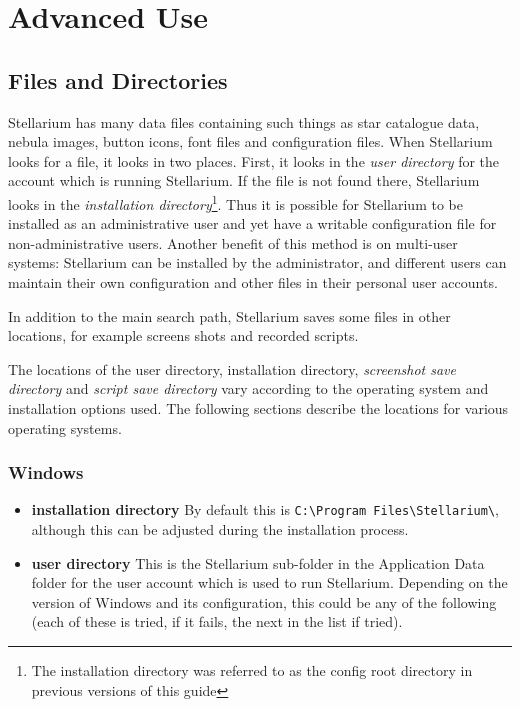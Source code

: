 
\chapter{Advanced Use}\label{advanced-use}

\section{Files and Directories}\label{files-and-directories}

Stellarium has many data files containing such things as star catalogue
data, nebula images, button icons, font files and configuration files.
When Stellarium looks for a file, it looks in two places. First, it
looks in the \emph{user directory} for the account which is running
Stellarium. If the file is not found there, Stellarium looks in the
\emph{installation directory}\footnote{The installation directory was
  referred to as the config root directory in previous versions of this
  guide}. Thus it is possible for Stellarium to be installed as an
administrative user and yet have a writable configuration file for
non-administrative users. Another benefit of this method is on
multi-user systems: Stellarium can be installed by the administrator,
and different users can maintain their own configuration and other files
in their personal user accounts.

In addition to the main search path, Stellarium saves some files in
other locations, for example screens shots and recorded scripts.

The locations of the user directory, installation directory,
\emph{screenshot save directory} and \emph{script save directory} vary
according to the operating system and installation options used. The
following sections describe the locations for various operating systems.

\subsection{Windows}\label{windows}

\begin{itemize}
\item
  \textbf{installation directory} By default this is
  \texttt{C:\textbackslash{}Program\ Files\textbackslash{}Stellarium\textbackslash{}},
  although this can be adjusted during the installation process.
\item
  \textbf{user directory} This is the Stellarium sub-folder in the
  Application Data folder for the user account which is used to run
  Stellarium. Depending on the version of Windows and its configuration,
  this could be any of the following (each of these is tried, if it
  fails, the next in the list if tried).
\end{itemize}

